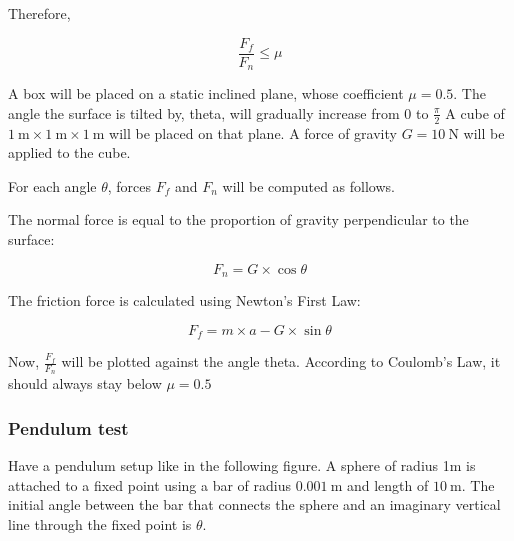 \documentclass[12pt]{article}
\begin{document}
Therefore,

\begin{equation}
\frac{F_f}{F_n} \leq \mu
\end{equation}

A box will be placed on a static inclined plane, whose coefficient $\mu = 0.5$.
The angle the surface is tilted by, theta, will gradually increase from 0 to $\frac{\pi}{2}$
A cube of $\SI{1}{\m} \times \SI{1}{\m} \times \SI{1}{\m}$ will be placed on that plane.
A force of gravity $G = \SI{10}{\N}$ will be applied to the cube.

\begin{center}
  \end{center}

For each angle $\theta$, forces $F_f$ and $F_n$ will be computed as follows.

The normal force is equal to the proportion of gravity perpendicular to the surface:

\begin{equation}
F_n = G \times \cos \theta
\end{equation}

The friction force is calculated using Newton's First Law:

\begin{equation}
F_f = m \times a - G \times \sin \theta
\end{equation}

Now, $\frac{F_f}{F_n}$ will be plotted against the angle theta. According to Coulomb's Law, it should always stay below $\mu = 0.5$

\subsubsection{Pendulum test}

Have a pendulum setup like in the following figure.
A sphere of radius 1m is attached to a fixed point using a bar of radius $\SI{0.001}{\m}$ and length of $\SI{10}{\m}$.
The initial angle between the bar that connects the sphere and an imaginary vertical line through the fixed point is $\theta$.
\end{document}

